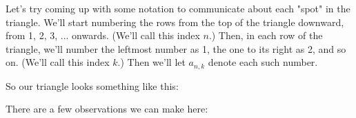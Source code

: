 

Let's try coming up with some notation to communicate about each "spot" in the triangle. We'll start numbering the rows from the top of the triangle downward, from 1, 2, 3, ... onwards. (We'll call this index $n$.) Then, in each row of the triangle, we'll number the leftmost number as 1, the one to its right as 2, and so on. (We'll call this index $k$.) Then we'll let $a_{n,k}$ denote each such number.

So our triangle looks something like this:


There are a few observations we can make here:

